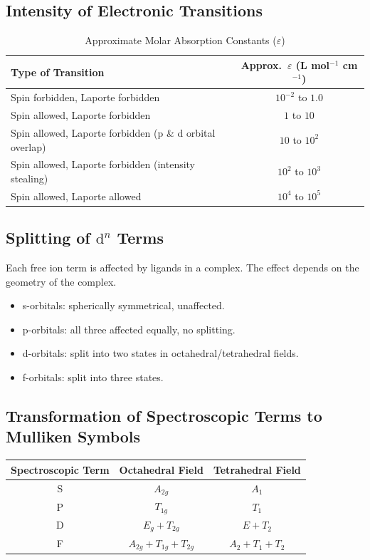\documentclass[12pt,a4paper]{article}
\begin{document}
\subsection{Intensity of Electronic Transitions}

\begin{table}[H]
\centering
\caption{Approximate Molar Absorption Constants ($\varepsilon$)}
\begin{tabular}{lc}
\toprule
\textbf{Type of Transition} & \textbf{Approx.\ $\varepsilon$ (L mol$^{-1}$ cm$^{-1}$)} \\
\midrule
Spin forbidden, Laporte forbidden & $10^{-2}$ to $1.0$ \\
Spin allowed, Laporte forbidden & $1$ to $10$ \\
Spin allowed, Laporte forbidden (p \& d orbital overlap) & $10$ to $10^2$ \\
Spin allowed, Laporte forbidden (intensity stealing) & $10^2$ to $10^3$ \\
Spin allowed, Laporte allowed & $10^4$ to $10^5$ \\
\bottomrule
\end{tabular}
\end{table}

\subsection{Splitting of $\mathrm{d}^n$ Terms}

Each free ion term is affected by ligands in a complex. The effect depends on the geometry of the complex.

\begin{itemize}
  \item s-orbitals: spherically symmetrical, unaffected.
  \item p-orbitals: all three affected equally, no splitting.
  \item d-orbitals: split into two states in octahedral/tetrahedral fields.
  \item f-orbitals: split into three states.
\end{itemize}

\subsection{Transformation of Spectroscopic Terms to Mulliken Symbols}

\begin{table}[H]
\centering
\begin{tabular}{ccc}
\toprule
\textbf{Spectroscopic Term} & \textbf{Octahedral Field} & \textbf{Tetrahedral Field} \\
\midrule
S & $A_{2g}$ & $A_1$ \\
P & $T_{1g}$ & $T_1$ \\
D & $E_g + T_{2g}$ & $E + T_2$ \\
F & $A_{2g} + T_{1g} + T_{2g}$ & $A_2 + T_1 + T_2$ \\
\bottomrule
\end{tabular}
\end{table}
\end{document}
